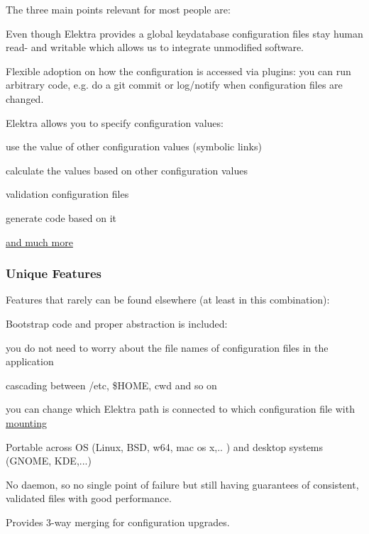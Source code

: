 The three main points relevant for most people are\+:


\begin{DoxyEnumerate}
\item Even though Elektra provides a global keydatabase configuration files stay human read-\/ and writable which allows us to integrate unmodified software.
\item Flexible adoption on how the configuration is accessed via plugins\+: you can run arbitrary code, e.\+g. do a {\ttfamily git commit} or log/notify when configuration files are changed.
\item Elektra allows you to specify configuration values\+:
\begin{DoxyItemize}
\item use the value of other configuration values (symbolic links)
\item calculate the values based on other configuration values
\item validation configuration files
\item generate code based on it
\item \hyperlink{md_src_plugins_README_src_plugins_README_md}{and much more}
\end{DoxyItemize}
\end{DoxyEnumerate}

\subsubsection*{Unique Features}

Features that rarely can be found elsewhere (at least in this combination)\+:


\begin{DoxyItemize}
\item Bootstrap code and proper abstraction is included\+:
\begin{DoxyItemize}
\item you do not need to worry about the file names of configuration files in the application
\item cascading between {\ttfamily /etc}, {\ttfamily \$\+H\+O\+M\+E}, {\ttfamily cwd} and so on
\item you can change which Elektra path is connected to which configuration file with \hyperlink{md_doc_help_elektra-mounting_doc_help_elektra-mounting_md}{mounting}
\item Portable across O\+S (Linux, B\+S\+D, w64, mac os x,.. ) and desktop systems (G\+N\+O\+M\+E, K\+D\+E,...)
\end{DoxyItemize}
\item No daemon, so no single point of failure but still having guarantees of consistent, validated files with good performance.
\item Provides 3-\/way merging for configuration upgrades.
\end{DoxyItemize}

